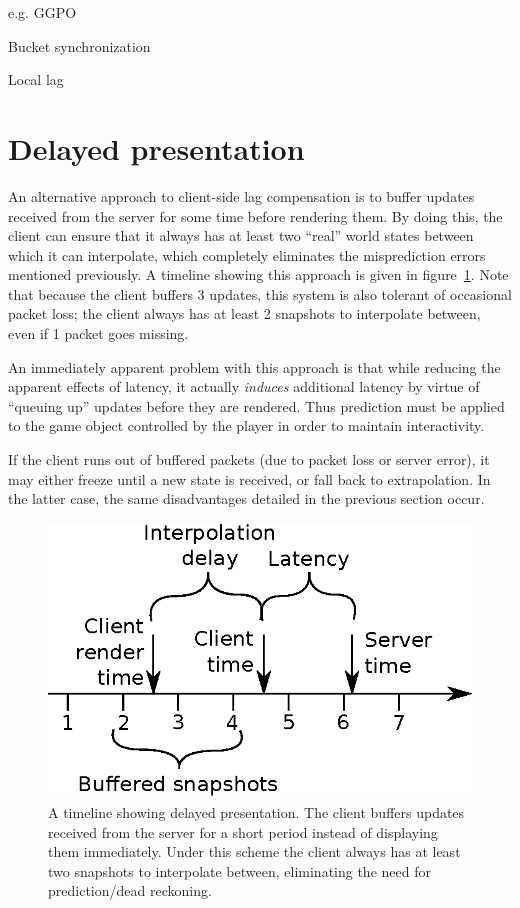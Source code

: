 \documentclass[conference]{IEEEtran}
\begin{document}
	e.g. GGPO

	Bucket synchronization

	Local lag

	\section{Delayed presentation}

	An alternative approach to client-side lag compensation is to buffer updates received from the server for some time before rendering them. By doing this, the client can ensure that it always has at least two ``real'' world states between which it can interpolate, which completely eliminates the misprediction errors mentioned previously. A timeline showing this approach is given in figure~\ref{fig:interpolation_timeline}. Note that because the client buffers 3 updates, this system is also tolerant of occasional packet loss; the client always has at least 2 snapshots to interpolate between, even if 1 packet goes missing.

	An immediately apparent problem with this approach is that while reducing the apparent effects of latency, it actually \emph{induces} additional latency by virtue of ``queuing up'' updates before they are rendered. Thus prediction must be applied to the game object controlled by the player in order to maintain interactivity.

	If the client runs out of buffered packets (due to packet loss or server error), it may either freeze until a new state is received, or fall back to extrapolation. In the latter case, the same disadvantages detailed in the previous section occur.

	\begin{figure}
		\centering\includegraphics[width=\linewidth]{figures/interpolation_timeline.eps}
		\caption{A timeline showing delayed presentation. The client buffers updates received from the server for a short period instead of displaying them immediately. Under this scheme the client always has at least two snapshots to interpolate between, eliminating the need for prediction/dead reckoning.}
		\label{fig:interpolation_timeline}
	\end{figure}
\end{document}
